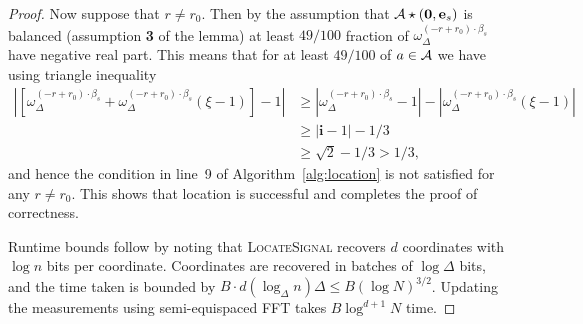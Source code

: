 \begin{proof}
Now suppose that $r\neq r_0$. Then by the assumption that ${\mathcal{A}}\star (\mathbf{0}, \mathbf{e}_s)$ is balanced (assumption {\bf 3} of the lemma) at least $49/100$ fraction of $\omega_\Delta^{(-r+r_0)\cdot \beta_s}$ have negative real part.  This means that for at least $49/100$ of $a\in {\mathcal{A}}$ we have using triangle inequality
\begin{equation*}
\begin{split}
\left|\left[\omega_\Delta^{(-r+r_0)\cdot \beta_s}+\omega_\Delta^{(-r+r_0)\cdot \beta_s}(\xi-1)\right]-1\right|&\geq \left|\omega_\Delta^{(-r+r_0)\cdot \beta_s}-1\right|-\left|\omega_\Delta^{(-r+r_0)\cdot \beta_s}(\xi-1)\right|\\
&\geq \left|\mathbf{i}-1\right|-1/3\\
&\geq \sqrt{2}-1/3> 1/3,
\end{split}
\end{equation*}
and hence the condition in line~9 of Algorithm~\ref{alg:location} is not satisfied for any $r\neq r_0$. This shows that location is successful and completes the proof of correctness.

Runtime bounds follow by noting that \textsc{LocateSignal} recovers $d$ coordinates with $\log n$ bits per coordinate. Coordinates are recovered in batches of $\log \Delta$ bits, and the time taken is bounded by $B\cdot d(\log_\Delta n)\Delta\leq B (\log N)^{3/2}$. Updating the measurements using semi-equispaced FFT takes $B\log^{d+1} N$ time.
\end{proof}




